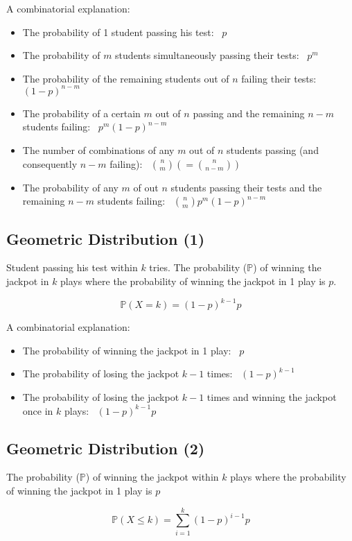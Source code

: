 \documentclass{article}
\begin{document}
	A combinatorial explanation:
	\begin{itemize}
		\item The probability of 1 student passing his test: \, $p$
		\item The probability of $m$ students simultaneously passing their tests: \, $p^m$
		\item The probability of the remaining students out of $n$ failing their tests: \, $(1-p)^{n-m}$
		\item The probability of a certain $m$ out of $n$ passing and the remaining $n-m$ students failing: \, $p^m(1-p)^{n-m}$
		\item The number of combinations of any $m$ out of $n$ students passing (and consequently $n-m$ failing): \, $\binom{n}{m}(=\binom{n}{n-m})$
		\item The probability of any $m$ of out $n$ students passing their tests and the remaining $n-m$ students failing: \, $\binom{n}{m}p^m(1-p)^{n-m}$
	\end{itemize}

	\subsection{Geometric Distribution (1)}
	Student passing his test within $k$ tries. The probability ($\mathbb{P}$) of winning the jackpot in $k$ plays where the probability of winning the jackpot in 1 play is $p$.

	\[
		\mathbb{P}(X=k)=(1-p)^{k-1}p
	\]

	A combinatorial explanation:
	\begin{itemize}
		\item The probability of winning the jackpot in 1 play: \, $p$
		\item The probability of losing the jackpot $k-1$ times: \, $(1-p)^{k-1}$
		\item The probability of losing the jackpot $k-1$ times and winning the jackpot once in $k$ plays: \, $(1-p)^{k-1}p$
	\end{itemize}

	\subsection{Geometric Distribution (2)}
	The probability ($\mathbb{P}$) of winning the jackpot within $k$ plays where the probability of winning the jackpot in 1 play is $p$

	\[
		\mathbb{P}(X\leq k)=\sum_{i=1}^k(1-p)^{i-1}p
	\]
\end{document}
